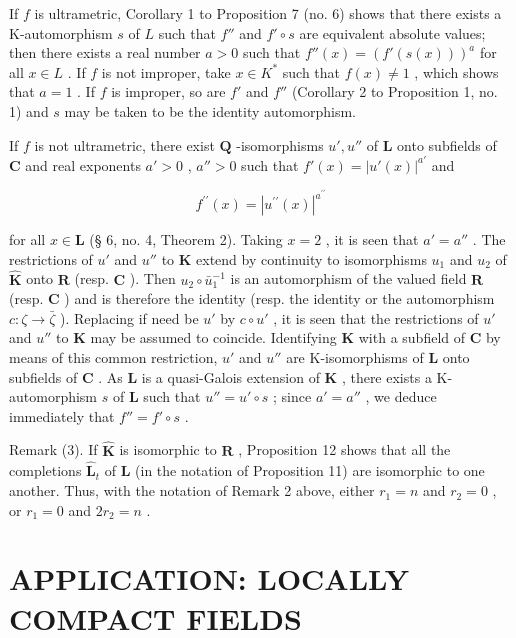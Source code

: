 If \(f\) is ultrametric, Corollary 1 to Proposition 7 (no. 6) shows that there exists a K-automorphism \(s\) of \(L\) such that \(f''\) and \(f' \circ s\) are equivalent absolute values; then there exists a real number \(a > 0\) such that \(f''(x) = (f'(s(x)))^a\) for all \(x \in L\) . If \(f\) is not improper, take \(x \in K^*\) such that \(f(x) \neq 1\) , which shows that \(a = 1\) . If \(f\) is improper, so are \(f'\) and \(f''\) (Corollary 2 to Proposition 1, no. 1) and \(s\) may be taken to be the identity automorphism.

If \(f\) is not ultrametric, there exist \(\mathbf{Q}\) -isomorphisms \(u', u''\) of \(\mathbf{L}\) onto subfields of \(\mathbf{C}\) and real exponents \(a' > 0\) , \(a'' > 0\) such that \(f'(x) = |u'(x)|^{a'}\) and

\[
f ^ {\prime \prime} (x) = | u ^ {\prime \prime} (x) | ^ {a ^ {\prime \prime}}
\]

for all \(x \in \mathbf{L}\) (§ 6, no. 4, Theorem 2). Taking \(x = 2\) , it is seen that \(a' = a''\) . The restrictions of \(u'\) and \(u''\) to \(\mathbf{K}\) extend by continuity to isomorphisms \(u_1\) and \(u_2\) of \(\hat{\mathbf{K}}\) onto \(\mathbf{R}\) (resp. \(\mathbf{C}\) ). Then \(u_2 \circ \bar{u}_1^{-1}\) is an automorphism of the valued field \(\mathbf{R}\) (resp. \(\mathbf{C}\) ) and is therefore the identity (resp. the identity or the automorphism \(c: \zeta \to \bar{\zeta}\) ). Replacing if need be \(u'\) by \(c \circ u'\) , it is seen that the restrictions of \(u'\) and \(u''\) to \(\mathbf{K}\) may be assumed to coincide. Identifying \(\mathbf{K}\) with a subfield of \(\mathbf{C}\) by means of this common restriction, \(u'\) and \(u''\) are K-isomorphisms of \(\mathbf{L}\) onto subfields of \(\mathbf{C}\) . As \(\mathbf{L}\) is a quasi-Galois extension of \(\mathbf{K}\) , there exists a K-automorphism \(s\) of \(\mathbf{L}\) such that \(u'' = u' \circ s\) ; since \(a' = a''\) , we deduce immediately that \(f'' = f' \circ s\) .

Remark (3). If \(\hat{\mathbf{K}}\) is isomorphic to \(\mathbf{R}\) , Proposition 12 shows that all the completions \(\hat{\mathbf{L}}_t\) of \(\mathbf{L}\) (in the notation of Proposition 11) are isomorphic to one another. Thus, with the notation of Remark 2 above, either \(r_1 = n\) and \(r_2 = 0\) , or \(r_1 = 0\) and \(2r_2 = n\) .

\section{APPLICATION: LOCALLY COMPACT FIELDS}

